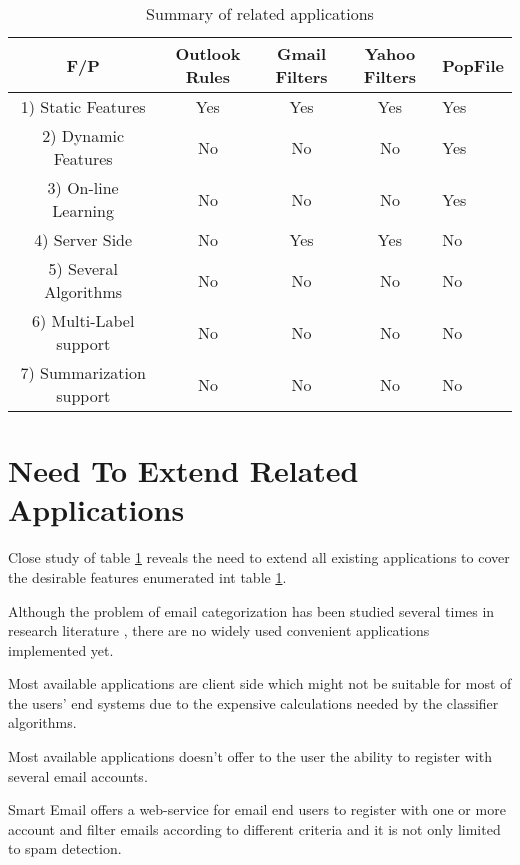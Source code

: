 \begin{center}
  \begin{table}
    \begin{tabular}{ | c | c | c | c | p{2cm} |}
      \hline
      F/P              & Outlook Rules & Gmail Filters & Yahoo Filters & PopFile \cite{POPFILE} \\ \hline
      1) Static Features  &    Yes        &    Yes        &    Yes      &    Yes  \\ \hline     
      2) Dynamic Features &    No        &    No         &    No        &    Yes  \\ \hline
      3) On-line Learning &    No        &    No         &    No        &    Yes  \\ \hline
      4) Server Side      &    No        &    Yes        &    Yes       &    No   \\ \hline
      5) Several Algorithms &    No        &    No &    No       &    No   \\ \hline
      6) Multi-Label support &    No        &    No &    No       &    No   \\ \hline
      7) Summarization support&    No        &    No &    No       &    No   \\ \hline
    \end{tabular}
    \caption[Summary of related work]{Summary of related applications}
    \label{related_applications_summary}
  \end{table}
\end{center}  


\section{Need To Extend Related Applications}
Close study of table \ref{related_applications_summary} reveals the need to extend all existing applications to cover the desirable features enumerated int table \ref{related_applications_summary}.

\begin{my_itemize}
    \item Although the problem of email categorization has been studied several
    times in research literature , there are no widely used convenient
    applications implemented yet.
    \item Most available applications are client side which might not be
    suitable for most of the users' end systems due to the expensive calculations
    needed by the classifier algorithms.
    \item Most available applications doesn't offer to the user the ability to 
    register with several email accounts.
    \item Smart Email offers a web-service for email end users to register with
    one or more account and filter emails according to different criteria and
    it is not only limited to spam detection.
\end{my_itemize}



